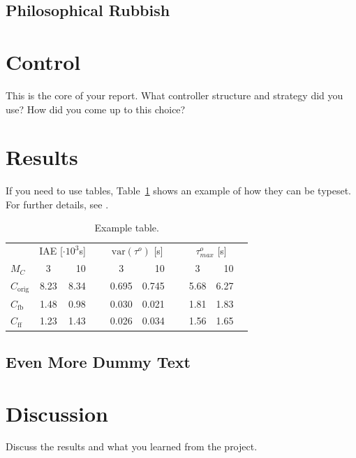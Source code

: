 \documentclass{LTHtwocol} %
\newcommand{\tabref}[1]{Table~\ref{#1}}
\begin{document}
\subsection{Philosophical Rubbish}
\kant[3]

\section{Control}
This is the core of your report. What controller structure and strategy did you use? How did you come up to this choice?

\section{Results}
If you need to use tables, \tabref{tab:extable} shows an example of how they can be typeset. For further details, see \cite{tablelatexwiki}.

\begin{table}
	\centering
	\caption{Example table.}
	\label{tab:extable}
	\begin{tabular}{lcrrcrrcrr} %
		\toprule
        & 
		\multicolumn{2}{c}{IAE [$\cdot 10^3$s]} & &
		\multicolumn{2}{c}{$\text{var}(\tau^o)$ [s]} & &  
		\multicolumn{2}{c}{$\tau^o_{max}$ [s]} \\[1mm]
		$M_C$            &  3     & 10  &~& 3     & 10    &~& 3    & 10 \\ 
        \midrule
		$C_{\text{orig}}$        & 8.23 & 8.34 &~& 0.695 & 0.745 &~& 5.68 & 6.27 \\ 
		$C_{\text{fb}}$          & 1.48 & 0.98 &~& 0.030 & 0.021 &~& 1.81 & 1.83 \\ 
		$C_{\text{ff}}$ & 1.23 & 1.43 &~& 0.026 & 0.034 &~& 1.56 & 1.65\\
        \bottomrule 
	\end{tabular}
\end{table}

\subsection{Even More Dummy Text}
\kant[4]

\section{Discussion}

Discuss the results and what you learned from the project.


\printbibliography
\end{document}
